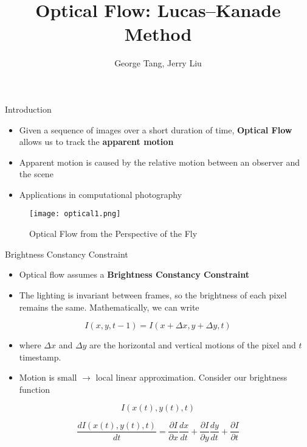 \documentclass[11pt]{beamer}
\title[]{Optical Flow: Lucas–Kanade Method}
\author[]{George Tang, Jerry Liu}
\institute[]{Thomas Jefferson High School for Science and Technology}
\begin{document}
\begin{frame}
\titlepage 
\end{frame}

\begin{frame}{Introduction}
\begin{itemize}
    \item Given a sequence of images over a short duration of time, \textbf{Optical Flow} allows us to track the \textbf{apparent motion} 
    \item Apparent motion is caused by the relative motion between an observer and the scene
    \item Applications in computational photography
\end{itemize}
\begin{figure}
    \texttt{[image: optical1.png]} \\
    \caption{Optical Flow from the Perspective of the Fly}
\end{figure}
\end{frame}


\begin{frame}{Brightness Constancy Constraint}
\begin{itemize}
    \item Optical flow assumes a \textbf{Brightness Constancy Constraint}
    \item The lighting is invariant between frames, so the brightness of each pixel remains the same. Mathematically, we can write
\end{itemize}
$$ I(x, y, t-1) = I(x+\Delta x, y+\Delta y, t)$$

\begin{itemize}
    \item where $\Delta x$ and $\Delta y$ are the horizontal and vertical motions of the pixel and $t$ timestamp.
    \item Motion is small $\rightarrow$ local linear approximation. Consider our brightness function
\end{itemize}
$$ I(x(t), y(t), t)$$

$$ \frac{dI(x(t), y(t), t)}{dt} = \frac{\partial I}{\partial x}\frac{dx}{dt} + \frac{\partial I}{\partial y}\frac{dy}{dt} + \frac{\partial I}{\partial t}$$
\end{frame}
\end{document}
